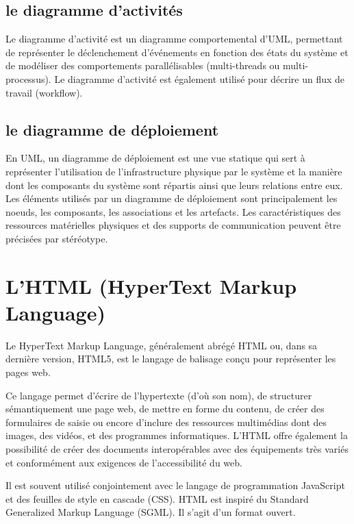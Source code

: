 \subsection{le diagramme d'activités}\label{subsec:diagrammes-d-activites}
Le diagramme d'activité est un diagramme comportemental d'UML, permettant de représenter
le déclenchement d'événements en fonction des états du système et de modéliser des
comportements parallélisables (multi-threads ou multi-processus).
Le diagramme d'activité est également utilisé pour décrire un flux de travail (workflow).

\subsection{le diagramme de déploiement}\label{subsec:diagrammes-de-deploiement}
En UML, un diagramme de déploiement est une vue statique qui sert à représenter
l'utilisation de l'infrastructure physique par le système et la manière dont
les composants du système sont répartis ainsi que leurs relations entre eux.
Les éléments utilisés par un diagramme de déploiement sont principalement les noeuds,
les composants, les associations et les artefacts.
Les caractéristiques des ressources matérielles physiques et
des supports de communication peuvent être précisées par stéréotype.

\section{L'HTML (HyperText Markup Language)}\label{sec:html}
Le HyperText Markup Language, généralement abrégé HTML ou, dans sa dernière version, HTML5,
est le langage de balisage conçu pour représenter les pages web.

Ce langage permet d’écrire de l’hypertexte (d’où son nom), de structurer sémantiquement
une page web, de mettre en forme du contenu, de créer des formulaires de saisie ou encore
d’inclure des ressources multimédias dont des images, des vidéos, et des programmes informatiques.
L'HTML offre également la possibilité de créer des documents interopérables avec des équipements
très variés et conformément aux exigences de l’accessibilité du web.

Il est souvent utilisé conjointement avec le langage de programmation JavaScript et des
feuilles de style en cascade (CSS). HTML est inspiré du Standard Generalized Markup Language (SGML).
Il s'agit d'un format ouvert.

